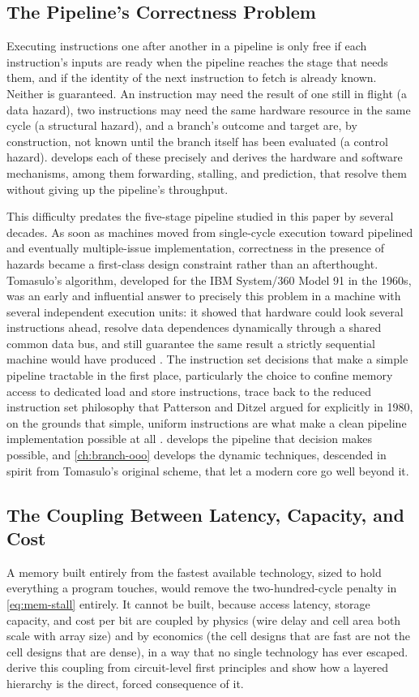 \documentclass[11pt,a4paper]{report}
\begin{document}
\subsection{The Pipeline's Correctness Problem}
Executing instructions one after another in a pipeline is only free if
each instruction's inputs are ready when the pipeline reaches the stage
that needs them, and if the identity of the next instruction to fetch is
already known. Neither is guaranteed. An instruction may need the result
of one still in flight (a data hazard), two instructions may need the
same hardware resource in the same cycle (a structural hazard), and a
branch's outcome and target are, by construction, not known until the
branch itself has been evaluated (a control hazard).
 develops each of these precisely and derives
the hardware and software mechanisms, among them forwarding, stalling,
and prediction, that resolve them without giving up the pipeline's
throughput.

This difficulty predates the five-stage pipeline studied in this paper
by several decades. As soon as machines moved from single-cycle
execution toward pipelined and eventually multiple-issue implementation,
correctness in the presence of hazards became a first-class design
constraint rather than an afterthought. Tomasulo's algorithm, developed
for the IBM System/360 Model 91 in the 1960s, was an early and
influential answer to precisely this problem in a machine with several
independent execution units: it showed that hardware could look several
instructions ahead, resolve data dependences dynamically through a
shared common data bus, and still guarantee the same result a strictly
sequential machine would have produced \cite{tomasulo1967}. The
instruction set decisions that make a simple pipeline tractable in the
first place, particularly the choice to confine memory access to
dedicated load and store instructions, trace back to the reduced
instruction set philosophy that Patterson and Ditzel argued for
explicitly in 1980, on the grounds that simple, uniform instructions are
what make a clean pipeline implementation possible at all
\cite{pattersonditzel1980}.  develops the
pipeline that decision makes possible, and \cref{ch:branch-ooo} develops
the dynamic techniques, descended in spirit from Tomasulo's original
scheme, that let a modern core go well beyond it.

\subsection{The Coupling Between Latency, Capacity, and Cost}
A memory built entirely from the fastest available technology, sized to
hold everything a program touches, would remove the two-hundred-cycle
penalty in \cref{eq:mem-stall} entirely. It cannot be built, because
access latency, storage capacity, and cost per bit are coupled by
physics (wire delay and cell area both scale with array size) and by
economics (the cell designs that are fast are not the cell designs that
are dense), in a way that no single technology has ever escaped.
 derive this coupling from circuit-level
first principles and show how a layered hierarchy is the direct, forced
consequence of it.
\end{document}
